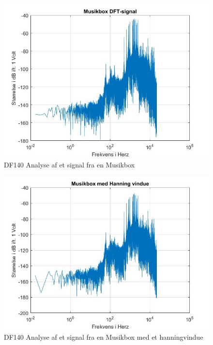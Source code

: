 \begin{figure}[H]
	\centering
	\includegraphics[width=140mm]{figures/Musikbox/DFT.jpg}
	\caption{DF140 Analyse af et signal fra en Musikbox}
	\label{fig:Musikbox DF140}
\end{figure}

\begin{figure}[H]
	\centering
	\includegraphics[width=140mm]{figures/Musikbox/hanning.jpg}
	\caption{DF140 Analyse af et signal fra en Musikbox med et hanningvindue}
	\label{fig:Musikbox hanning}
\end{figure}

